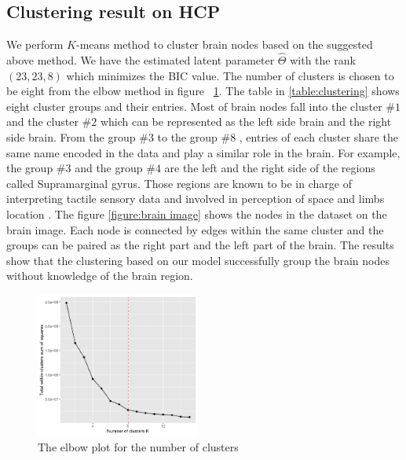 \documentclass[11pt]{article}
\theoremstyle{plain}
\theoremstyle{definition}
\begin{document}
\subsection{Clustering result on HCP}
We perform $K$-means method to cluster brain nodes based on the suggested above method. We have the estimated latent parameter $\hat\Theta$ with the rank $(23,23,8)$ which minimizes the BIC value. The number of clusters is chosen to be eight from the elbow method in figure ~\ref{figure:elbow}.
The table in \ref{table:clustering} shows eight cluster groups and their entries. Most of brain nodes fall into the cluster $\#1$ and the cluster $\#2$ which can be represented as the left side brain and the right side brain. From the group $\#3$ to the group $\#8$ , entries of each cluster share the same name encoded in the data and play a similar role in the brain. For example, the group $\#3$ and the group $\#4$ are the left and the right side of the regions called Supramarginal gyrus. Those regions are known to be in charge of interpreting tactile sensory data and involved in perception of space and limbs location \cite{carlson2012physiology,reed1994nature}. The figure \ref{figure:brain image} shows the nodes in the dataset on the brain image. Each node is connected by edges within the same cluster and the groups can be paired as the right part and the left part of the brain. The results show that the clustering based on our model successfully group the brain nodes without knowledge of the brain region.
\begin{figure}[H]
  \label{figure:elbow}
  \begin{center}
    \includegraphics[width=0.48\textwidth]{elbowmethod.png}
  \end{center}
  \caption{The elbow plot for the number of clusters}
\end{figure}
\end{document}
